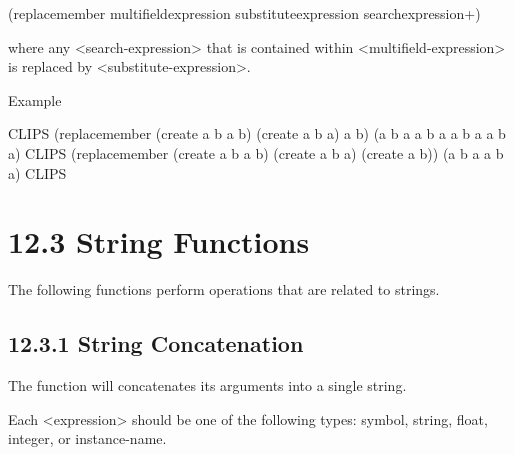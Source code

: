 \documentclass[letterpaper,10pt,english]{sphinxmanual}
\begin{document}

\begin{sphinxVerbatim}[commandchars=\\\{\}]
(replace\PYGZhy{}member\PYGZdl{} \PYGZlt{}multifield\PYGZhy{}expression\PYGZgt{} \PYGZlt{}substitute\PYGZhy{}expression\PYGZgt{}
   \PYGZlt{}search\PYGZhy{}expression\PYGZgt{}+)
\end{sphinxVerbatim}

where any \textless{}search-expression\textgreater{} that is contained within
\textless{}multifield-expression\textgreater{} is replaced by \textless{}substitute-expression\textgreater{}.

Example

\begin{sphinxVerbatim}[commandchars=\\\{\}]
CLIPS\PYGZgt{} (replace\PYGZhy{}member\PYGZdl{} (create\PYGZdl{} a b a b) (create\PYGZdl{} a b a) a b)
(a b a a b a a b a a b a)
CLIPS\PYGZgt{} (replace\PYGZhy{}member\PYGZdl{} (create\PYGZdl{} a b a b) (create\PYGZdl{} a b a) (create\PYGZdl{} a b))
(a b a a b a)
CLIPS\PYGZgt{}
\end{sphinxVerbatim}


\section{12.3 String Functions}
\label{\detokenize{actions:string-functions}}
The following functions perform operations that are related to strings.


\subsection{12.3.1 String Concatenation}
\label{\detokenize{actions:string-concatenation}}
The  function will concatenates its arguments into a single
string.


\begin{sphinxVerbatim}[commandchars=\\\{\}]
 
\end{sphinxVerbatim}

Each \textless{}expression\textgreater{} should be one of the following types: symbol, string,
float, integer, or instance-name.
\end{document}
